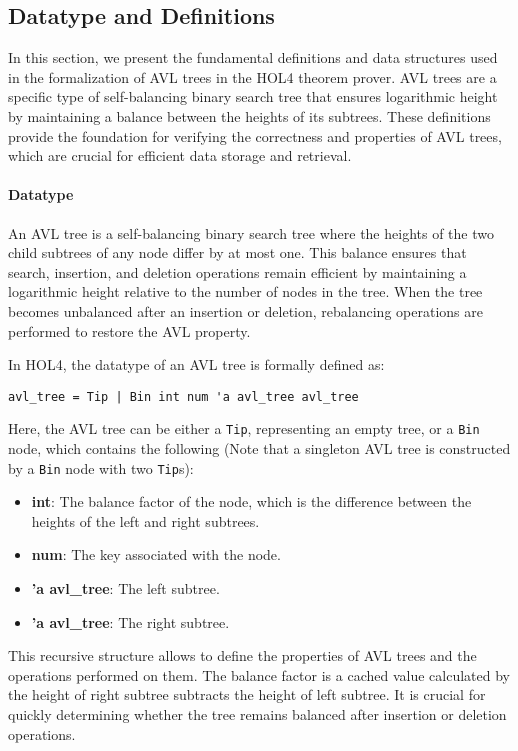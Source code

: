 \documentclass[12pt]{article}
\begin{document}
\subsection{Datatype and Definitions}

In this section, we present the fundamental definitions and data structures used in the formalization of AVL trees in the HOL4 theorem prover. AVL trees are a specific type of self-balancing binary search tree that ensures logarithmic height by maintaining a balance between the heights of its subtrees. These definitions provide the foundation for verifying the correctness and properties of AVL trees, which are crucial for efficient data storage and retrieval.

\paragraph{Datatype}
An AVL tree is a self-balancing binary search tree where the heights of the two child subtrees of any node differ by at most one. This balance ensures that search, insertion, and deletion operations remain efficient by maintaining a logarithmic height relative to the number of nodes in the tree. When the tree becomes unbalanced after an insertion or deletion, rebalancing operations are performed to restore the AVL property.

In HOL4, the datatype of an AVL tree is formally defined as:

\begin{verbatim}
avl_tree = Tip | Bin int num 'a avl_tree avl_tree
\end{verbatim}

Here, the AVL tree can be either a \texttt{Tip}, representing an empty tree, or a \texttt{Bin} node, which contains the following (Note that a singleton AVL tree is constructed by a \texttt{Bin} node with two \texttt{Tip}s):
\begin{itemize}
    \item \textbf{int}: The balance factor of the node, which is the difference between the heights of the left and right subtrees.
    \item \textbf{num}: The key associated with the node.
    \item \textbf{'a avl\_tree}: The left subtree.
    \item \textbf{'a avl\_tree}: The right subtree.
\end{itemize}

This recursive structure allows to define the properties of AVL trees and the operations performed on them. The balance factor is a cached value calculated by the height of right subtree subtracts the height of left subtree. It is crucial for quickly determining whether the tree remains balanced after insertion or deletion operations.
\end{document}
